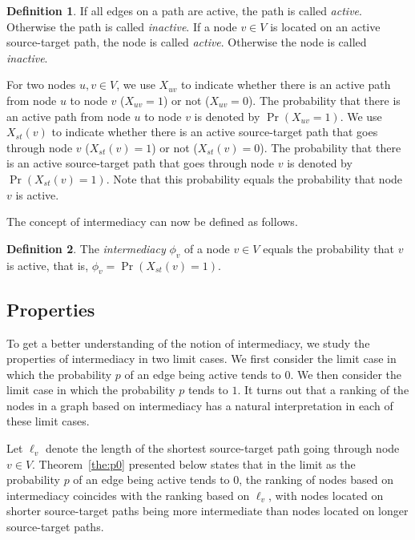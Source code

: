 \documentclass{article}
\theoremstyle{definition}
\newtheorem{definition}{Definition}
\newcommand{\theref}[1]{Theorem~\ref{the:#1}\xspace}
\begin{document}
\begin{definition}
	If all edges on a path are active, the path is called \emph{active}. Otherwise the path is called \emph{inactive}. If a node $v \in V$ is located on an active source-target path, the node is called \emph{active}. Otherwise the node is called \emph{inactive}.
\end{definition}

For two nodes $u, v \in V$, we use $X_{uv}$ to indicate whether there is an active path from node $u$ to node $v$ ($X_{uv} = 1$) or not ($X_{uv} = 0$). The probability that there is an active path from node $u$ to node $v$ is denoted by $\Pr(X_{uv} = 1)$. We use $X_{st}(v)$ to indicate whether there is an active source-target path that goes through node $v$ ($X_{st}(v) = 1$) or not ($X_{st}(v) = 0$). The probability that there is an active source-target path that goes through node $v$ is denoted by $\Pr(X_{st}(v) = 1)$. Note that this probability equals the probability that node $v$ is active.

The concept of intermediacy can now be defined as follows.

\begin{definition}
	The \emph{intermediacy} $\phi_v$ of a node $v \in V$ equals the probability that $v$ is active, that is, $\phi_v = \Pr(X_{st}(v) = 1)$.
\end{definition}

\subsection{\label{sec:properties}Properties}

To get a better understanding of the notion of intermediacy, we study the properties of intermediacy in two limit cases. We first consider the limit case in which the probability $p$ of an edge being active tends to $0$. We then consider the limit case in which the probability $p$ tends to $1$. It turns out that a ranking of the nodes in a graph based on intermediacy has a natural interpretation in each of these limit cases.

Let $\ell_v$ denote the length of the shortest source-target path going through node $v \in V$. \theref{p0} presented below states that in the limit as the probability $p$ of an edge being active tends to $0$, the ranking of nodes based on intermediacy coincides with the ranking based on $\ell_v$, with nodes located on shorter source-target paths being more intermediate than nodes located on longer source-target paths.
\end{document}
